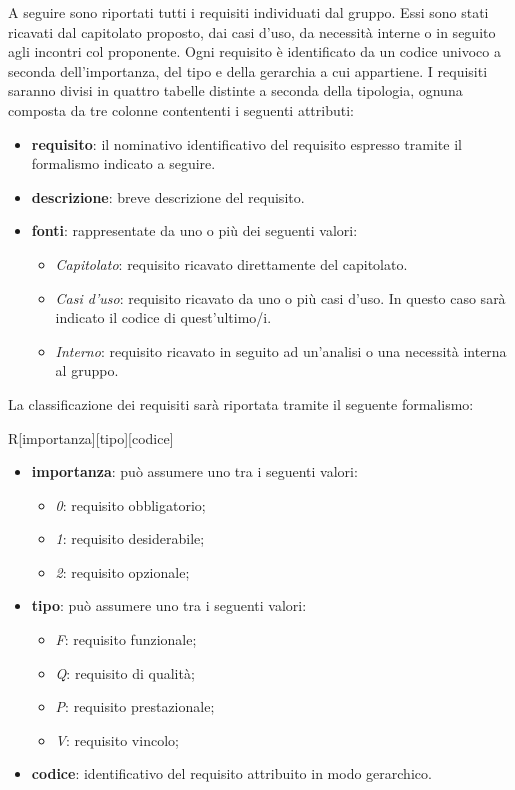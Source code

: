 A seguire sono riportati tutti i requisiti individuati dal gruppo. Essi sono stati ricavati dal capitolato proposto, dai casi d'uso, da necessità interne o in seguito agli incontri col proponente. Ogni requisito è identificato da un codice univoco a seconda dell'importanza, del tipo e della gerarchia a cui appartiene.
I requisiti saranno divisi in quattro tabelle distinte a seconda della tipologia, ognuna composta da tre colonne contententi i seguenti attributi:
\begin{itemize}
	\item \textbf{requisito}: il nominativo identificativo del requisito espresso tramite il formalismo indicato a seguire.
	\item \textbf{descrizione}: breve descrizione del requisito.
	\item \textbf{fonti}: rappresentate da uno o più dei seguenti valori:
	\begin{itemize}
		\item \emph{Capitolato}: requisito ricavato direttamente del capitolato.
		\item \emph{Casi d'uso}: requisito ricavato da uno o più casi d'uso. In questo caso sarà indicato il codice di quest'ultimo/i.
		\item \emph{Interno}: requisito ricavato in seguito ad un'analisi o una necessità interna al gruppo.
	\end{itemize}
\end{itemize}

La classificazione dei requisiti sarà riportata tramite il seguente formalismo:
\begin{center}
	R[importanza][tipo][codice]
\end{center}
\begin{itemize}
	\item \textbf{importanza}: può assumere uno tra i seguenti valori:
	\begin{itemize}
		\item \emph{0}: requisito obbligatorio;
		\item \emph{1}: requisito desiderabile;
		\item \emph{2}: requisito opzionale;
	\end{itemize}
	\item \textbf{tipo}: può assumere uno tra i seguenti valori:
	\begin{itemize}
		\item \emph{F}: requisito funzionale;
		\item \emph{Q}: requisito di qualità;
		\item \emph{P}: requisito prestazionale;
		\item \emph{V}: requisito vincolo;
	\end{itemize}
	\item \textbf{codice}: identificativo del requisito attribuito in modo gerarchico.
\end{itemize}



